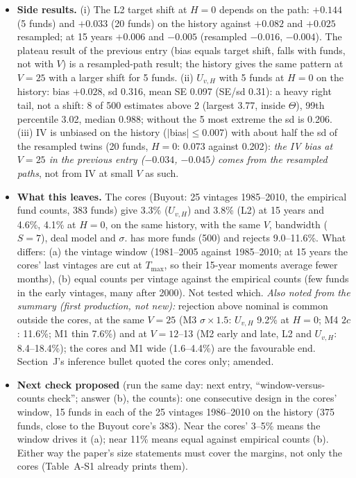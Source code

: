 \documentclass[11pt]{article}
\newcommand{\code}[1]{\texttt{\detokenize{#1}}}
\begin{document}
\begin{itemize}
\item \textbf{Side results.} (i) The L2 target shift at $H=0$ depends on the path: $+0.144$ (5 funds) and $+0.033$ (20 funds) on the history against $+0.082$ and $+0.025$ resampled; at 15 years $+0.006$ and $-0.005$ (resampled $-0.016$, $-0.004$). The plateau result of the previous entry (bias equals target shift, falls with funds, not with $V$) is a resampled-path result; the history gives the same pattern at $V=25$ with a larger shift for 5 funds. (ii) $U_{v,H}$ with 5 funds at $H=0$ on the history: bias $+0.028$, sd 0.316, mean SE 0.097 (SE/sd 0.31): a heavy right tail, not a shift: 8 of 500 estimates above 2 (largest 3.77, inside $\Theta$), 99th percentile 3.02, median 0.988; without the 5 most extreme the sd is 0.206. (iii) IV is unbiased on the history ($|$bias$|\le0.007$) with about half the sd of the resampled twins (20 funds, $H=0$: 0.073 against 0.202): \emph{the IV bias at $V=25$ in the previous entry ($-0.034$, $-0.045$) comes from the resampled paths}, not from IV at small $V$ as such.
\item \textbf{What this leaves.} The cores (Buyout: 25 vintages 1985--2010, the empirical fund counts, 383 funds) give 3.3\% ($U_{v,H}$) and 3.8\% (L2) at 15 years and 4.6\%, 4.1\% at $H=0$, on the same history, with the same $V$, bandwidth ($S=7$), deal model and $\sigma$. \code{h_V25_n20} has more funds (500) and rejects 9.0--11.6\%. What differs: (a) the vintage window (1981--2005 against 1985--2010; at 15 years the cores' last vintages are cut at $T_{\max}$, so their 15-year moments average fewer months), (b) equal counts per vintage against the empirical counts (few funds in the early vintages, many after 2000). Not tested which. \emph{Also noted from the summary (first production, not new):} rejection above nominal is common outside the cores, at the same $V=25$ (M3 $\sigma\times1.5$: $U_{v,H}$ 9.2\% at $H=0$; M4 $2c$: 11.6\%; M1 thin 7.6\%) and at $V=12$--13 (M2 early and late, L2 and $U_{v,H}$: 8.4--18.4\%); the cores and M1 wide (1.6--4.4\%) are the favourable end. Section~J's inference bullet quoted the cores only; amended.
\item \textbf{Next check proposed} (run the same day: next entry, ``window-versus-counts check''; answer (b), the counts): one consecutive design in the cores' window, 15 funds in each of the 25 vintages 1986--2010 on the history (375 funds, close to the Buyout core's 383). Near the cores' 3--5\% means the window drives it (a); near 11\% means equal against empirical counts (b). Either way the paper's size statements must cover the margins, not only the cores (Table~A-S1 already prints them).
\end{itemize}
\end{document}
